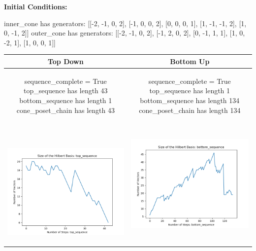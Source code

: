 \documentclass[10pt]{article}
\begin{document}
\textbf{Initial Conditions:}
\begin{SAGE}
inner_cone has generators: 
[[-2, -1, 0, 2], [-1, 0, 0, 2], [0, 0, 0, 1], [1, -1, -1, 2], [1, 0, -1, 2]]
outer_cone has generators: 
[[-2, -1, 0, 2], [-1, 2, 0, 2], [0, -1, 1, 1], [1, 0, -2, 1], [1, 0, 0, 1]]

\end{SAGE}
\begin{tabular}{c|c}
\textbf{Top Down} & \textbf{Bottom Up} \\ \hline  
\begin{SAGE}
	sequence_complete = True
	top_sequence has length 43
	bottom_sequence has length 1
	cone_poset_chain has length 43
\end{SAGE} 
&
\begin{SAGE}
	sequence_complete = True
	top_sequence has length 1
	bottom_sequence has length 134
	cone_poset_chain has length 134
\end{SAGE} 
\\ \hline
\
\begin{minipage}{.45\textwidth}
\includegraphics[width=\textwidth]{"DATA/4d/5 generators 2 bound G/top_sequence SIZE"}
\end{minipage} &
\begin{minipage}{.45\textwidth}
\includegraphics[width=\textwidth]{"DATA/4d/5 generators 2 bound G bottomup/bottom_sequence SIZE"}

\end{minipage}
\end{tabular}
\end{document}
